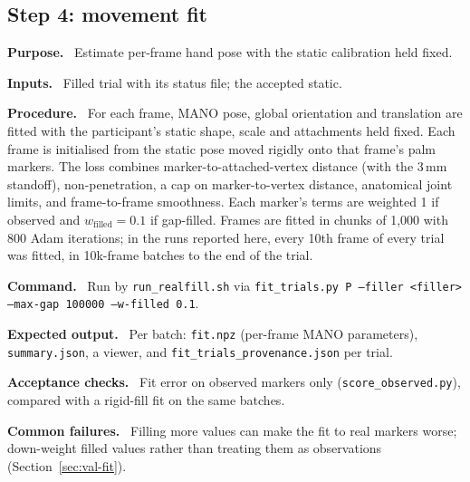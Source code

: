\documentclass[11pt,a4paper]{article}
\newcommand{\field}[1]{\par\smallskip\noindent\textbf{#1.}\ }
\begin{document}
\subsection{Step 4: movement fit}\label{sec:step-fit}
\field{Purpose} Estimate per-frame hand pose with the static calibration held fixed.
\field{Inputs} Filled trial with its status file; the accepted static.
\field{Procedure} For each frame, MANO pose, global orientation and translation are fitted with the participant's
static shape, scale and attachments held fixed. Each frame is initialised from the static pose moved rigidly onto that
frame's palm markers. The loss combines marker-to-attached-vertex distance (with the 3\,mm standoff), non-penetration,
a cap on marker-to-vertex distance, anatomical joint limits, and frame-to-frame smoothness. Each marker's terms are
weighted 1 if observed and $w_\text{filled}=0.1$ if gap-filled. Frames are fitted in chunks of 1{,}000 with 800 Adam
iterations; in the runs reported here, every 10th frame of every trial was fitted, in 10k-frame batches to the end of
the trial.
\field{Command} Run by \texttt{run\_realfill.sh} via
\texttt{fit\_trials.py P --filler <filler> --max-gap 100000 --w-filled 0.1}.
\field{Expected output} Per batch: \texttt{fit.npz} (per-frame MANO parameters), \texttt{summary.json}, a viewer, and
\texttt{fit\_trials\_provenance.json} per trial.
\field{Acceptance checks} Fit error on observed markers only (\texttt{score\_observed.py}), compared with a rigid-fill
fit on the same batches.
\field{Common failures} Filling more values can make the fit to real markers worse; down-weight filled values rather
than treating them as observations (Section~\ref{sec:val-fit}).
\end{document}
